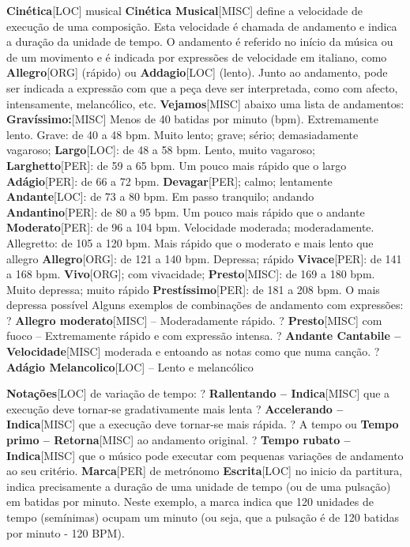 \documentclass[a4paper,12pt]{article}
\begin{document}
\textbf{Cinética}\textsc{[LOC]} musical \textbf{Cinética Musical}\textsc{[MISC]} define a velocidade de execução de uma composição. Esta velocidade é chamada de andamento e indica a duração da unidade de tempo. O andamento é referido no início da música ou de um movimento e é indicada por expressões de velocidade em italiano, como \textbf{Allegro}\textsc{[ORG]} (rápido) ou \textbf{Addagio}\textsc{[LOC]} (lento). Junto ao andamento, pode ser indicada a expressão com que a peça deve ser interpretada, como com afecto, intensamente, melancólico, etc. \textbf{Vejamos}\textsc{[MISC]} abaixo uma lista de andamentos: \textbf{Gravíssimo:}\textsc{[MISC]} Menos de 40 batidas por minuto (bpm). Extremamente lento. Grave: de 40 a 48 bpm. Muito lento; grave; sério; demasiadamente vagaroso; \textbf{Largo}\textsc{[LOC]}: de 48 a 58 bpm. Lento, muito vagaroso; \textbf{Larghetto}\textsc{[PER]}: de 59 a 65 bpm. Um pouco mais rápido que o largo \textbf{Adágio}\textsc{[PER]}: de 66 a 72 bpm. \textbf{Devagar}\textsc{[PER]}; calmo; lentamente \textbf{Andante}\textsc{[LOC]}: de 73 a 80 bpm. Em passo tranquilo; andando \textbf{Andantino}\textsc{[PER]}: de 80 a 95 bpm. Um pouco mais rápido que o andante \textbf{Moderato}\textsc{[PER]}: de 96 a 104 bpm. Velocidade moderada; moderadamente. Allegretto: de 105 a 120 bpm. Mais rápido que o moderato e mais lento que allegro \textbf{Allegro}\textsc{[ORG]}: de 121 a 140 bpm. Depressa; rápido \textbf{Vivace}\textsc{[PER]}: de 141 a 168 bpm. \textbf{Vivo}\textsc{[ORG]}; com vivacidade; \textbf{Presto}\textsc{[MISC]}: de 169 a 180 bpm. Muito depressa; muito rápido \textbf{Prestíssimo}\textsc{[PER]}: de 181 a 208 bpm. O mais depressa possível Alguns exemplos de combinações de andamento com expressões: ? \textbf{Allegro moderato}\textsc{[MISC]} -- Moderadamente rápido. ? \textbf{Presto}\textsc{[MISC]} com fuoco -- Extremamente rápido e com expressão intensa. ? \textbf{Andante Cantabile -- Velocidade}\textsc{[MISC]} moderada e entoando as notas como que numa canção. ? \textbf{Adágio Melancolico}\textsc{[LOC]} -- Lento e melancólico

\textbf{Notações}\textsc{[LOC]} de variação de tempo: ? \textbf{Rallentando -- Indica}\textsc{[MISC]} que a execução deve tornar-se gradativamente mais lenta ? \textbf{Accelerando -- Indica}\textsc{[MISC]} que a execução deve tornar-se mais rápida. ? A tempo ou \textbf{Tempo primo -- Retorna}\textsc{[MISC]} ao andamento original. ? \textbf{Tempo rubato -- Indica}\textsc{[MISC]} que o músico pode executar com pequenas variações de andamento ao seu critério. \textbf{Marca}\textsc{[PER]} de metrónomo \textbf{Escrita}\textsc{[LOC]} no inicio da partitura, indica precisamente a duração de uma unidade de tempo (ou de uma pulsação) em batidas por minuto. Neste exemplo, a marca indica que 120 unidades de tempo (semínimas) ocupam um minuto (ou seja, que a pulsação é de 120 batidas por minuto - 120 BPM).
\end{document}
